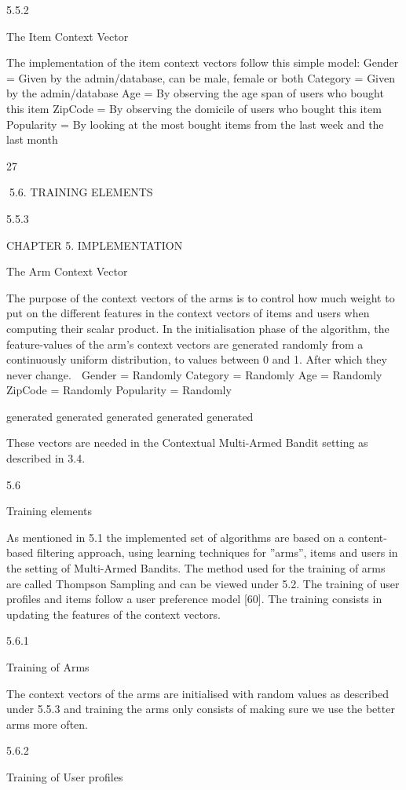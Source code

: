 5.5.2

The Item Context Vector

The implementation of the item context vectors follow this simple model:
Gender = Given by the admin/database, can be male, female or both
Category = Given by the admin/database
Age = By observing the age span of users who bought this item
ZipCode = By observing the domicile of users who bought this item
Popularity = By looking at the most bought items from the last week and the last month

27

5.6. TRAINING ELEMENTS

5.5.3

CHAPTER 5. IMPLEMENTATION

The Arm Context Vector

The purpose of the context vectors of the arms is to control how much weight to put
on the different features in the context vectors of items and users when computing their
scalar product. In the initialisation phase of the algorithm, the feature-values of the
arm’s context vectors are generated randomly from a continuously uniform distribution,
to values between 0 and 1. After which they never change.

Gender = Randomly
Category = Randomly
Age = Randomly
ZipCode = Randomly
Popularity = Randomly

generated
generated
generated
generated
generated

These vectors are needed in the Contextual Multi-Armed Bandit setting as described in
3.4.

5.6

Training elements

As mentioned in 5.1 the implemented set of algorithms are based on a content-based
filtering approach, using learning techniques for ”arms”, items and users in the setting of
Multi-Armed Bandits. The method used for the training of arms are called Thompson
Sampling and can be viewed under 5.2. The training of user profiles and items follow a
user preference model [60]. The training consists in updating the features of the context
vectors.

5.6.1

Training of Arms

The context vectors of the arms are initialised with random values as described under
5.5.3 and training the arms only consists of making sure we use the better arms more
often.

5.6.2

Training of User profiles

